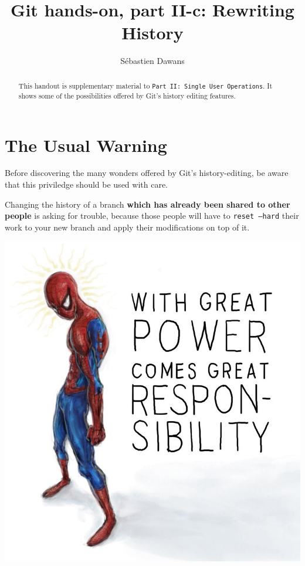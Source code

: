 \documentclass{../../common/tufte-latex/tufte-handout}
\title{Git hands-on, part II-c: Rewriting History}
\author{S\'ebastien Dawans}
\begin{document}
\maketitle%

\tableofcontents

\begin{abstract}
\noindent
This handout is supplementary material to \texttt{Part II: Single User Operations}. It shows some of the possibilities offered by Git's history editing features.
\end{abstract}

\section{The Usual Warning}

Before discovering the many wonders offered by Git's history-editing, be aware that this priviledge should be used with care.

Changing the history of a branch \textbf{which has already been shared to other people} is asking for trouble, because those people will have to \texttt{reset --hard} their work to your new branch and apply their modifications on top of it.

\begin{marginfigure}%
  \centering
  \includegraphics[width=\linewidth]{spiderman.jpg}
  \label{fig:spiderman}
\end{marginfigure}
\end{document}
